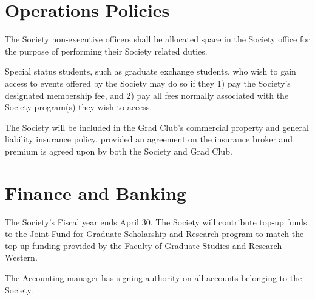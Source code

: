 \section{Operations Policies}
\begin{longenum}[ label*=\thesection.\arabic*., align=left]
\item The Society non-executive officers shall be allocated space in the Society office for the purpose of performing their Society related duties.
\item Special status students, such as graduate exchange students, who wish to gain access to events offered by the Society may do so if they 1) pay the Society’s designated membership fee, and 2) pay all fees normally associated with the Society program(s) they wish to access.
\item The Society will be included in the Grad Club’s commercial property and general liability insurance policy, provided an agreement on the insurance broker and premium is agreed upon by both the Society and Grad Club.
\end{longenum}

\section{Finance and Banking}
\begin{longenum}[ label*=\thesection.\arabic*., align=left]
\item The Society’s Fiscal year ends April 30. The Society will contribute top-up funds to the Joint Fund for Graduate Scholarship and Research program to match the top-up funding provided by the Faculty of Graduate Studies and Research Western.
\item The Accounting manager has signing authority on all accounts belonging to the Society.
\end{longenum}

